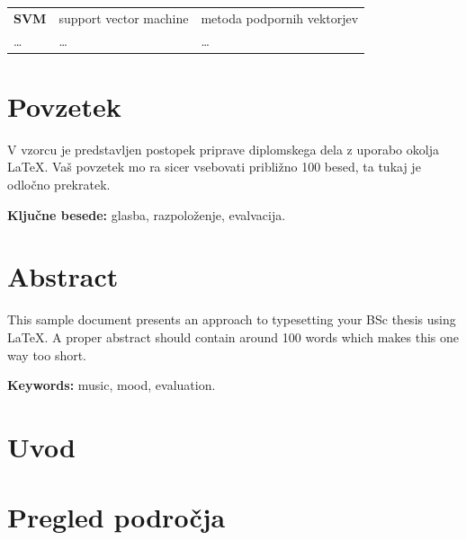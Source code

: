 \documentclass[a4paper, 12pt]{book}
\newcommand{\tkeywords}{glasba, razpoloženje, evalvacija}
\newcommand{\tkeywordsEn}{music, mood, evaluation}
\newcommand{\clearemptydoublepage}{\newpage{\pagestyle{empty}\cleardoublepage}}
\begin{document}
{\begin{tabular}{l|l|l}
  
  {\bf SVM} & support vector machine & metoda podpornih vektorjev \\
  \dots & \dots & \dots \\
\end{tabular}



\clearemptydoublepage

\chapter*{Povzetek}
V vzorcu je predstavljen postopek priprave diplomskega dela z uporabo okolja \LaTeX. Vaš povzetek mo ra sicer vsebovati približno 100 besed, ta tukaj je odločno prekratek.
\bigskip

\noindent\textbf{Ključne besede:} \tkeywords.
\clearemptydoublepage

\chapter*{Abstract}
This sample document presents an approach to typesetting your BSc thesis using \LaTeX. A proper abstract should contain around 100 words which makes this one way too short.
\bigskip

\noindent\textbf{Keywords:} \tkeywordsEn.
\clearemptydoublepage

\mainmatter
\setcounter{page}{1}
\pagestyle{fancy}


\chapter{Uvod}


\chapter{Pregled področja}

}
\end{document}

